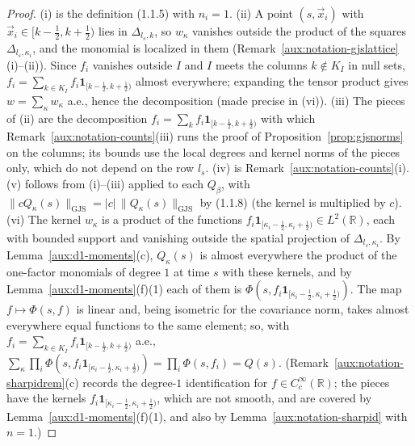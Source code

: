 \documentclass[11pt,a4paper]{article}
\theoremstyle{plain}
\theoremstyle{definition}
\theoremstyle{plain}
\theoremstyle{definition}
\newcommand{\R}{\mathbb{R}}
\newcommand{\GJS}[1]{\lVert #1\rVert_{\mathrm{GJS}}}   %
\begin{document}
\begin{proof}
(i) is the definition (1.1.5) with $n_i=1$.  (ii) A point $(s,\vec x_i)$ with
$\vec x_i\in[k-\frac12,k+\frac12)$ lies in $\Delta_{l_s,k}$, so $w_\kappa$ vanishes outside the
product of the squares $\Delta_{l_s,\kappa_i}$, and the monomial is localized in them
(Remark~\ref{aux:notation-gjslattice}(i)--(ii)).  Since $f_i$ vanishes outside $I$ and $I$ meets
the columns $k\notin K_I$ in null sets, $f_i=\sum_{k\in K_I}f_i\mathbf
1_{[k-\frac12,k+\frac12)}$ almost everywhere; expanding the tensor product gives
$w=\sum_\kappa w_\kappa$ a.e., hence the decomposition (made precise in (vi)).  (iii) The pieces of
(ii) are the decomposition $f_i=\sum_kf_i\mathbf 1_{[k-\frac12,k+\frac12)}$ with which
Remark~\ref{aux:notation-counts}(iii) runs the proof of Proposition~\ref{prop:gjsnorms} on the
columns; its bounds use the local degrees and kernel norms of the pieces only, which do not
depend on the row $l_s$.  (iv) is Remark~\ref{aux:notation-counts}(i).  (v) follows from
(i)--(iii) applied to each $Q_\beta$, with $\GJS{cQ_\kappa(s)}=|c|\,\GJS{Q_\kappa(s)}$ by
(1.1.8) (the kernel is multiplied by $c$).  (vi) The kernel $w_\kappa$ is a product of the
functions $f_i\mathbf 1_{[\kappa_i-\frac12,\kappa_i+\frac12)}\in L^2(\R)$, each with bounded support
and vanishing outside the spatial projection of $\Delta_{l_s,\kappa_i}$.  By
Lemma~\ref{aux:d1-moments}(c), $Q_\kappa(s)$ is almost everywhere the product of the one-factor
monomials of degree $1$ at time $s$ with these kernels, and by Lemma~\ref{aux:d1-moments}(f)(1)
each of them is $\Phi(s,f_i\mathbf 1_{[\kappa_i-\frac12,\kappa_i+\frac12)})$.  The map
$f\mapsto\Phi(s,f)$ is linear and, being isometric for the covariance norm, takes almost
everywhere equal functions to the same element; so, with $f_i=\sum_{k\in K_I}f_i\mathbf
1_{[k-\frac12,k+\frac12)}$ a.e.,
$\sum_\kappa\prod_i\Phi(s,f_i\mathbf 1_{[\kappa_i-\frac12,\kappa_i+\frac12)})=
\prod_i\Phi(s,f_i)=Q(s)$.  (Remark~\ref{aux:notation-sharpidrem}(c) records the degree-$1$
identification for $f\in C_c^\infty(\R)$; the pieces have the kernels
$f_i\mathbf 1_{[\kappa_i-\frac12,\kappa_i+\frac12)}$, which are not smooth, and are covered by
Lemma~\ref{aux:d1-moments}(f)(1), and also by Lemma~\ref{aux:notation-sharpid} with $n=1$.)
\end{proof}
\end{document}
